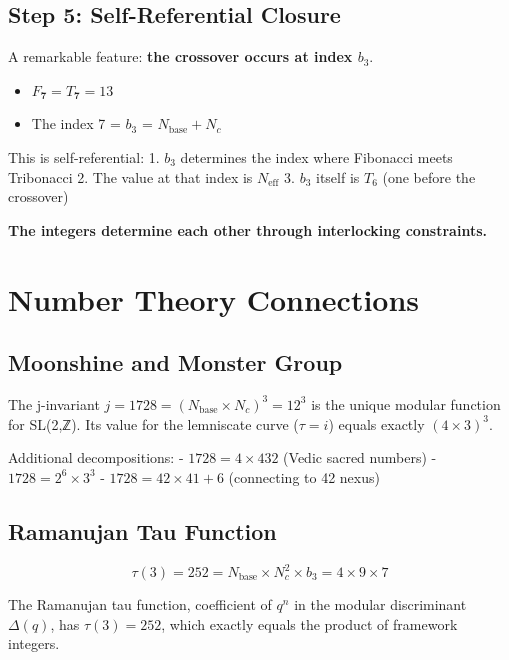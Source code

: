 \documentclass[
  11pt,
  letterpaper,
  twoside,
  openright]{book}
\providecommand{\tightlist}{%
  \setlength{\itemsep}{0pt}\setlength{\parskip}{0pt}}
\begin{document}
\subsection{Step 5: Self-Referential
Closure}\label{step-5-self-referential-closure}

A remarkable feature: \textbf{the crossover occurs at index \(b_3\)}.

\begin{itemize}
\tightlist
\item
  \(F_{\mathbf{7}} = T_{\mathbf{7}} = 13\)
\item
  The index 7 = \(b_3\) = \(N_{\text{base}} + N_c\)
\end{itemize}

This is self-referential: 1. \(b_3\) determines the index where
Fibonacci meets Tribonacci 2. The value at that index is
\(N_{\text{eff}}\) 3. \(b_3\) itself is \(T_6\) (one before the
crossover)

\textbf{The integers determine each other through interlocking
constraints.}

\section{Number Theory Connections}\label{number-theory-connections}

\subsection{Moonshine and Monster
Group}\label{moonshine-and-monster-group}

The j-invariant \(j = 1728 = (N_{\text{base}} \times N_c)^3 = 12^3\) is
the unique modular function for SL(2,ℤ). Its value for the lemniscate
curve (\(\tau = i\)) equals exactly \((4 \times 3)^3\).

Additional decompositions: - \(1728 = 4 \times 432\) (Vedic sacred
numbers) - \(1728 = 2^6 \times 3^3\) - \(1728 = 42 \times 41 + 6\)
(connecting to 42 nexus)

\subsection{Ramanujan Tau Function}\label{ramanujan-tau-function}

\[\tau(3) = 252 = N_{\text{base}} \times N_c^2 \times b_3 = 4 \times 9 \times 7\]

The Ramanujan tau function, coefficient of \(q^n\) in the modular
discriminant \(\Delta(q)\), has \(\tau(3) = 252\), which exactly equals
the product of framework integers.
\end{document}
